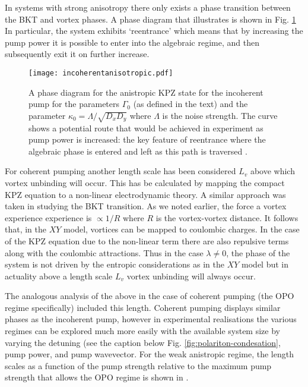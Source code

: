 \documentclass[letterpaper, 10 pt, conference]{IEEEtran}  %
\newcommand{\fig}[1]{Fig. #1}
\begin{document}
In systems with strong anisotropy there only exists a phase transition between the BKT and vortex phases.
A phase diagram that illustrates is shown in \fig{\ref{fig:incoherentanisotropic}}
In particular, the system exhibits `reentrance' which means that by increasing the pump power it is possible to enter into the algebraic regime, and then subsequently exit it on further increase.
\begin{figure}[htbp!]
	\centering
	\texttt{[image: incoherentanisotropic.pdf]}
	\caption{A phase diagram for the anistropic KPZ state for the incoherent pump for the parameters $\Gamma_0$ (as defined in the text) and the parameter $\kappa_0 = \Lambda/\sqrt{D_x D_y}$ where $\Lambda$ is the noise strength. 
	The curve shows a potential route that would be achieved in experiment as pump power is increased: the key feature of reentrance where the algebraic phase is entered and left as this path is traversed \cite{2015PhRvX...5a1017A}.}
	\label{fig:incoherentanisotropic}
\end{figure}

For coherent pumping another length scale has been considered $L_v$ above which vortex unbinding will occur. 
This has be calculated by mapping the compact KPZ equation to a non-linear electrodynamic theory\cite{PhysRevB.94.104520}.
A similar approach was taken in studying the BKT transition. 
As we noted earlier, the force a vortex experience experience is $\propto 1/R$ where $R$ is the vortex-vortex distance. 
It follows that, in the $XY$ model, vortices can be mapped to coulombic charges. 
In the case of the KPZ equation due to the non-linear term there are also repulsive terms along with the coulombic attractions. 
Thus in the case $\lambda \neq 0$, the phase of the system is not driven by the entropic considerations as in the $XY$ model but in actuality above a length scale $L_v$ vortex unbinding will always occur. 

The analogous analysis of the above in the case of coherent pumping (the OPO regime specifically) included this length.
Coherent pumping displays similar phases as the incoherent pump, however in experimental realisations the various regimes can be explored much more easily with the available system size by varying the detuning (see the caption below \fig{\ref{fig:polariton-condesation}}, pump power, and pump wavevector. 
For the weak anistropic regime, the length scales as a function of the pump strength relative to the maximum pump strength that allows the OPO regime is shown in .
\end{document}
